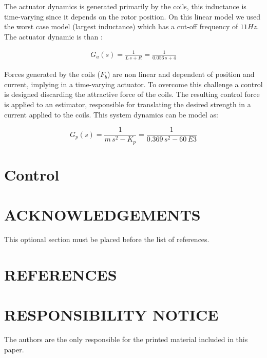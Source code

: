 \documentclass[10pt,fleqn,a4paper,twoside]{article}
\begin{document}
	
	The actuator dynamics is generated primarily by the coils,  this inductance is time-varying since it depends on the rotor position. On this linear model we used the worst case model (largest inductance) which has a cut-off frequency of $11Hz$. The actuator dynamic is than :
	
	\begin{align}
		G_a(s) = \frac{1}{L \, s + R} =  \frac{1}{0.056 \, s + 4}
	\end{align}
	
	Forces generated by the coils ($F_b$) are non linear and dependent of position and current, implying in a time-varying actuator. To overcome this challenge a control is designed discarding the attractive force of the coils. The resulting control force is applied to an estimator, responsible for translating the desired strength in a current applied to the coils. This system dynamics can be model as:
	
	\begin{equation}
		G_p(s) = \frac{1}{m \, s^2 - K_p} = \frac{1}{0.369 \, s^2 - 60 \,E3}
	\end{equation}


%
	
	\section{Control}
	
	\section{ACKNOWLEDGEMENTS}
	
	This optional section must be placed before the list of references.
	
	\section{REFERENCES} 
	
	
	\renewcommand{\refname}{}
	
	
	\section{RESPONSIBILITY NOTICE}
	
	The authors are the only responsible for the printed material included in this paper.
	
\end{document}
